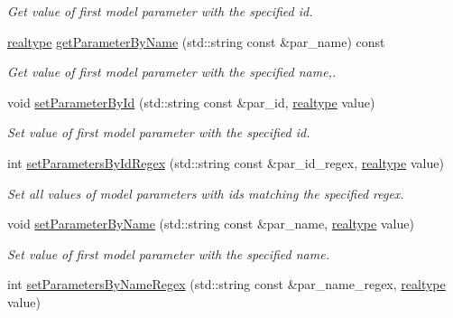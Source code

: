 \begin{DoxyCompactItemize}
\begin{DoxyCompactList}\small\item\em Get value of first model parameter with the specified id. \end{DoxyCompactList}\item 
\mbox{\hyperlink{namespaceamici_a1bdce28051d6a53868f7ccbf5f2c14a3}{realtype}} \mbox{\hyperlink{classamici_1_1_model_a19b349ca9793d45fda7ef8ea7422747a}{get\+Parameter\+By\+Name}} (std\+::string const \&par\+\_\+name) const
\begin{DoxyCompactList}\small\item\em Get value of first model parameter with the specified name,. \end{DoxyCompactList}\item 
void \mbox{\hyperlink{classamici_1_1_model_a995357a19663980279249d4b89a88f7a}{set\+Parameter\+By\+Id}} (std\+::string const \&par\+\_\+id, \mbox{\hyperlink{namespaceamici_a1bdce28051d6a53868f7ccbf5f2c14a3}{realtype}} value)
\begin{DoxyCompactList}\small\item\em Set value of first model parameter with the specified id. \end{DoxyCompactList}\item 
int \mbox{\hyperlink{classamici_1_1_model_ab66d6b754637ed68449af96f5887a0be}{set\+Parameters\+By\+Id\+Regex}} (std\+::string const \&par\+\_\+id\+\_\+regex, \mbox{\hyperlink{namespaceamici_a1bdce28051d6a53868f7ccbf5f2c14a3}{realtype}} value)
\begin{DoxyCompactList}\small\item\em Set all values of model parameters with ids matching the specified regex. \end{DoxyCompactList}\item 
void \mbox{\hyperlink{classamici_1_1_model_a6c5ceb2ba684cf68a7f21ad865091200}{set\+Parameter\+By\+Name}} (std\+::string const \&par\+\_\+name, \mbox{\hyperlink{namespaceamici_a1bdce28051d6a53868f7ccbf5f2c14a3}{realtype}} value)
\begin{DoxyCompactList}\small\item\em Set value of first model parameter with the specified name. \end{DoxyCompactList}\item 
int \mbox{\hyperlink{classamici_1_1_model_a1307ed45ccda80e84174d6b495c85d8d}{set\+Parameters\+By\+Name\+Regex}} (std\+::string const \&par\+\_\+name\+\_\+regex, \mbox{\hyperlink{namespaceamici_a1bdce28051d6a53868f7ccbf5f2c14a3}{realtype}} value)

\end{DoxyCompactItemize}
